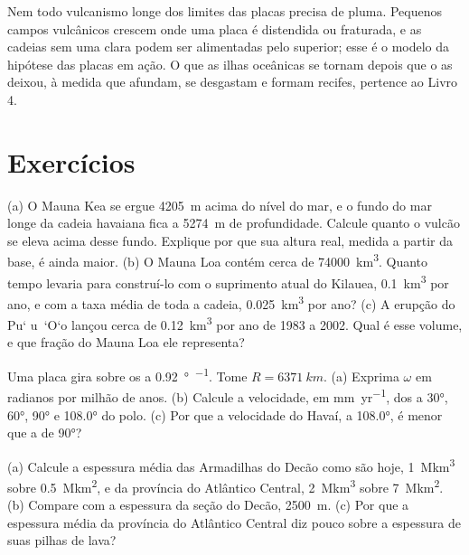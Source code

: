 Nem todo vulcanismo longe dos limites das placas precisa de pluma. Pequenos campos vulcânicos crescem onde uma placa é distendida ou fraturada, e as cadeias sem uma  clara podem ser alimentadas pelo  superior; esse é o modelo da hipótese das placas em ação. O que as ilhas oceânicas se tornam depois que o  as deixou, à medida que afundam, se desgastam e formam recifes, pertence ao Livro 4.

\section{Exercícios}

\begin{exercise}[$\star$]\label{exo:b1:hotspots:1}
(a) O Mauna Kea se ergue \qty{4205}{m} acima do nível do mar, e o fundo do mar longe da cadeia havaiana fica a \qty{5274}{m} de profundidade. Calcule quanto o vulcão se eleva acima desse fundo. Explique por que sua altura real, medida a partir da base, é ainda maior. (b) O Mauna Loa contém cerca de \qty{74000}{km^3}. Quanto tempo levaria para construí-lo com o suprimento atual do Kilauea, \qty{0.1}{km^3} por ano, e com a taxa média de toda a cadeia, \qty{0.025}{km^3} por ano? (c) A erupção do Pu\textquoteleft
u~\textquoteleft O\textquoteleft o lançou cerca de \qty{0.12}{km^3} por ano de 1983 a 2002. Qual é esse volume, e que fração do Mauna Loa ele representa?
\end{exercise}

\begin{exercise}[$\star$]\label{exo:b1:hotspots:2}
Uma placa gira sobre os  a \qty{0.92}{\degree\per\Myr}. Tome $R = \qty{6371}{km}$. (a) Exprima $\omega$ em radianos por milhão de anos. (b) Calcule a velocidade, em \unit{mm.yr^{-1}}, dos  a \ang{30}, \ang{60}, \ang{90} e \ang{108.0} do polo. (c) Por que a velocidade do Havaí, a \ang{108.0}, é menor que a de \ang{90}?
\end{exercise}

\begin{exercise}[$\star$]\label{exo:b1:hotspots:3}
(a) Calcule a espessura média das Armadilhas do Decão como são hoje, \qty{1}{\mega km^3} sobre \qty{0.5}{\mega km^2}, e da província do Atlântico Central, \qty{2}{\mega km^3} sobre \qty{7}{\mega km^2}. (b) Compare com a espessura da seção do Decão, \qty{2500}{m}. (c) Por que a espessura média da província do Atlântico Central diz pouco sobre a espessura de suas pilhas de lava?
\end{exercise}

